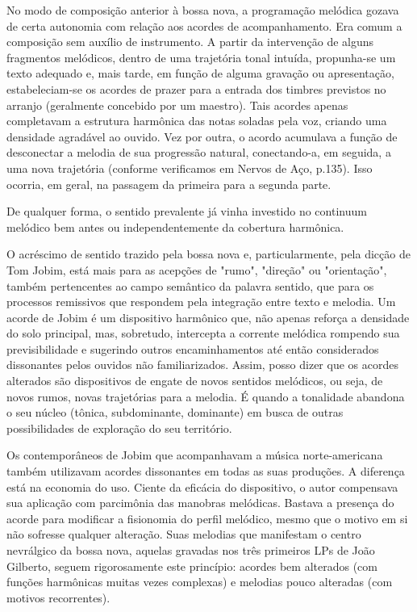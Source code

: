 No modo de composição anterior à bossa nova, a programação melódica
gozava de certa autonomia com relação aos acordes de acompanhamento. Era
comum a composição sem auxílio de instrumento. A partir da intervenção
de alguns fragmentos melódicos, dentro de uma trajetória tonal intuída,
propunha-se um texto adequado e, mais tarde, em função de alguma
gravação ou apresentação, estabeleciam-se os acordes de prazer para a
entrada dos timbres previstos no arranjo (geralmente concebido por um
maestro). Tais acordes apenas completavam a estrutura harmônica das
notas soladas pela voz, criando uma densidade agradável ao ouvido. Vez
por outra, o acordo acumulava a função de desconectar a melodia de sua
progressão natural, conectando-a, em seguida, a uma nova trajetória
(conforme verificamos em Nervos de Aço, p.135). Isso ocorria, em geral,
na passagem da primeira para a segunda parte.

De qualquer forma, o sentido prevalente já vinha investido no continuum
melódico bem antes ou independentemente da cobertura harmônica.

O acréscimo de sentido trazido pela bossa nova e, particularmente, pela
dicção de Tom Jobim, está mais para as acepções de "rumo", "direção" ou
"orientação", também pertencentes ao campo semântico da palavra sentido,
que para os processos remissivos que respondem pela integração entre
texto e melodia. Um acorde de Jobim é um dispositivo harmônico que, não
apenas reforça a densidade do solo principal, mas, sobretudo, intercepta
a corrente melódica rompendo sua previsibilidade e sugerindo outros
encaminhamentos até então considerados dissonantes pelos ouvidos não
familiarizados. Assim, posso dizer que os acordes alterados são
dispositivos de engate de novos sentidos melódicos, ou seja, de novos
rumos, novas trajetórias para a melodia. É quando a tonalidade abandona
o seu núcleo (tônica, subdominante, dominante) em busca de outras
possibilidades de exploração do seu território.~

Os contemporâneos de Jobim que acompanhavam a música norte-americana
também utilizavam acordes dissonantes em todas as suas produções. A
diferença está na economia do uso. Ciente da eficácia do dispositivo, o
autor compensava sua aplicação com parcimônia das manobras melódicas.
Bastava a presença do acorde para modificar a fisionomia do perfil
melódico, mesmo que o motivo em si não sofresse qualquer alteração. Suas
melodias que manifestam o centro nevrálgico da bossa nova, aquelas
gravadas nos três primeiros LPs de João Gilberto, seguem rigorosamente
este princípio: acordes bem alterados (com funções harmônicas muitas
vezes complexas) e melodias pouco alteradas (com motivos recorrentes).

